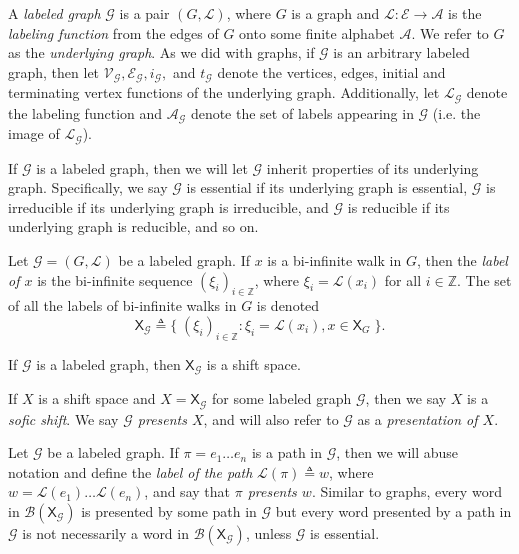 \documentclass[hidelinks]{report}
\newcommand{\Ac}{\mathcal{A}}  %
\newcommand{\Lc}{\mathcal{L}}  %
\newcommand{\Gc}{\mathcal{G}}  %
\newcommand{\Vc}{\mathcal{V}}
\newcommand{\Ec}{\mathcal{E}}
\newcommand{\Bc}{\mathcal{B}}
\newcommand{\shift}[1]{\mathsf{X}_{#1}}
\newcommand{\term}[1]{\textit{#1}}
\theoremstyle{definition}
\begin{document}
\begin{definition}
    A \term{labeled graph} \(\Gc\) is a pair \((G, \Lc)\), where \(G\) is a graph and \(\Lc : \Ec \to \Ac\) is the 
    \term{labeling function} from the edges of \(G\) onto some finite alphabet \(\Ac\). We 
    refer to \(G\) as the \term{underlying graph}.
    As we did with graphs, if \(\Gc\) is an arbitrary labeled graph, then 
    let \(\Vc_\Gc, \Ec_\Gc, i_\Gc,\) and \(t_\Gc\) denote the vertices, edges, 
    initial and terminating vertex functions of the underlying graph. Additionally,
    let \(\Lc_\Gc\) denote the labeling function and \(\Ac_\Gc\) denote the set 
    of labels appearing in \(\Gc\) (i.e. the image of \(\Lc_\Gc\)).
\end{definition}

If \(\Gc\) is a labeled graph, then we will let \(\Gc\) inherit properties of its underlying 
graph. Specifically, we say \(\Gc\) is essential if its underlying graph is essential, 
\(\Gc\) is irreducible if its underlying graph is irreducible, and \(\Gc\) is reducible 
if its underlying graph is reducible, and so on. 

\begin{definition}
    Let \(\Gc = (G, \Lc)\) be a labeled graph. If \(x\) is a bi-infinite walk in \(G\), 
    then the \term{label of \(x\)} is the bi-infinite sequence \((\xi_i)_{i \in \mathbb{Z}}\), 
    where \(\xi_i = \Lc(x_i)\) for all \(i \in \mathbb{Z}\). The set of all the labels of 
    bi-infinite walks in \(G\) is denoted
    \[\shift{\Gc} \triangleq \big\{ \; (\xi_i)_{i \in \mathbb{Z}} : \xi_i = \Lc(x_i), x \in \shift{G} \; \big\}.  \]
\end{definition}

\begin{theorem}[name=\cite{lind1995introduction}]
    If \(\Gc\) is a labeled graph, then \(\shift{\Gc}\) is a shift space.
\end{theorem}

If \(X\) is a shift space and \(X = \shift{\Gc}\) for some labeled graph \(\Gc\), 
then we say \(X\) is a \term{sofic shift}. We say \term{\(\Gc\) presents \(X\)}, 
and will also refer to \(\Gc\) as a \term{presentation of \(X\)}. 

Let \(\Gc\) be a labeled graph. 
If \(\pi = e_1 \dots e_n\) is a path in \(\Gc\), then we will abuse notation and 
define the \term{label of the path} \(\Lc(\pi) \triangleq w\),
where \(w = \Lc(e_1) \dots \Lc(e_n)\), and say that \term{\(\pi\)
presents \(w\)}. 
Similar to graphs, every word in \(\Bc(\shift{\Gc})\) is
presented by some path in \(\Gc\) but every word presented by a path in \(\Gc\) is 
not necessarily a word in \(\Bc(\shift{\Gc})\), unless \(\Gc\) is essential.
\end{document}
